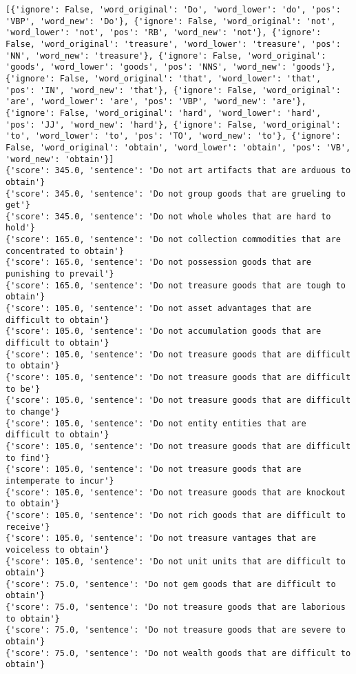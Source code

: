 \documentclass[12pt,a4paper,oneside]{book}
\begin{document}
\begin{verbatim}
[{'ignore': False, 'word_original': 'Do', 'word_lower': 'do', 'pos': 'VBP', 'word_new': 'Do'}, {'ignore': False, 'word_original': 'not', 'word_lower': 'not', 'pos': 'RB', 'word_new': 'not'}, {'ignore': False, 'word_original': 'treasure', 'word_lower': 'treasure', 'pos': 'NN', 'word_new': 'treasure'}, {'ignore': False, 'word_original': 'goods', 'word_lower': 'goods', 'pos': 'NNS', 'word_new': 'goods'}, {'ignore': False, 'word_original': 'that', 'word_lower': 'that', 'pos': 'IN', 'word_new': 'that'}, {'ignore': False, 'word_original': 'are', 'word_lower': 'are', 'pos': 'VBP', 'word_new': 'are'}, {'ignore': False, 'word_original': 'hard', 'word_lower': 'hard', 'pos': 'JJ', 'word_new': 'hard'}, {'ignore': False, 'word_original': 'to', 'word_lower': 'to', 'pos': 'TO', 'word_new': 'to'}, {'ignore': False, 'word_original': 'obtain', 'word_lower': 'obtain', 'pos': 'VB', 'word_new': 'obtain'}]
{'score': 345.0, 'sentence': 'Do not art artifacts that are arduous to obtain'}
{'score': 345.0, 'sentence': 'Do not group goods that are grueling to get'}
{'score': 345.0, 'sentence': 'Do not whole wholes that are hard to hold'}
{'score': 165.0, 'sentence': 'Do not collection commodities that are concentrated to obtain'}
{'score': 165.0, 'sentence': 'Do not possession goods that are punishing to prevail'}
{'score': 165.0, 'sentence': 'Do not treasure goods that are tough to obtain'}
{'score': 105.0, 'sentence': 'Do not asset advantages that are difficult to obtain'}
{'score': 105.0, 'sentence': 'Do not accumulation goods that are difficult to obtain'}
{'score': 105.0, 'sentence': 'Do not treasure goods that are difficult to obtain'}
{'score': 105.0, 'sentence': 'Do not treasure goods that are difficult to be'}
{'score': 105.0, 'sentence': 'Do not treasure goods that are difficult to change'}
{'score': 105.0, 'sentence': 'Do not entity entities that are difficult to obtain'}
{'score': 105.0, 'sentence': 'Do not treasure goods that are difficult to find'}
{'score': 105.0, 'sentence': 'Do not treasure goods that are intemperate to incur'}
{'score': 105.0, 'sentence': 'Do not treasure goods that are knockout to obtain'}
{'score': 105.0, 'sentence': 'Do not rich goods that are difficult to receive'}
{'score': 105.0, 'sentence': 'Do not treasure vantages that are voiceless to obtain'}
{'score': 105.0, 'sentence': 'Do not unit units that are difficult to obtain'}
{'score': 75.0, 'sentence': 'Do not gem goods that are difficult to obtain'}
{'score': 75.0, 'sentence': 'Do not treasure goods that are laborious to obtain'}
{'score': 75.0, 'sentence': 'Do not treasure goods that are severe to obtain'}
{'score': 75.0, 'sentence': 'Do not wealth goods that are difficult to obtain'}


\end{verbatim}
\end{document}

